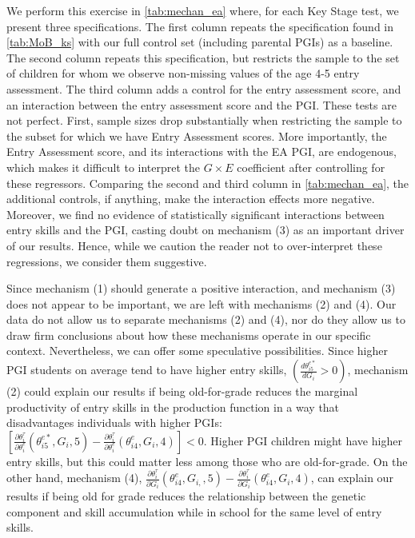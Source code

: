 \documentclass[12pt,a4paper]{article}
\begin{document}
\begin{bibunit}
We perform this exercise in  \autoref{tab:mechan_ea} where, for each Key Stage test, we present three specifications. The first column repeats the specification found in \autoref{tab:MoB_ks} with our full control set (including parental PGIs) as a baseline.  The second column repeats this specification, but restricts the sample to the set of children for whom we observe non-missing values of the age 4-5 entry assessment.  The third column adds a control for the entry assessment score, and an interaction between the entry assessment score and the PGI. These tests are not perfect. First, sample sizes drop substantially when restricting the sample to the subset for which we have Entry Assessment scores. More importantly, the Entry Assessment score, and its interactions with the EA PGI, are endogenous, which makes it difficult to interpret the $G\times{}E$ coefficient after controlling for these regressors. Comparing the second and third column in \autoref{tab:mechan_ea}, the additional controls, if anything, make the  interaction effects more negative. Moreover, we find no evidence of statistically significant interactions between entry skills and the PGI, casting doubt on mechanism (3) as an important driver of our results. Hence, while we caution the reader not to over-interpret these regressions, we consider them suggestive. 

Since mechanism (1) should generate a positive interaction, and mechanism (3) does not appear to be important, we are left with mechanisms (2) and (4). Our data do not allow us to separate mechanisms (2) and (4), nor do they allow us to draw firm conclusions about how these mechanisms operate in our specific context.  Nevertheless, we can offer some speculative possibilities. Since higher PGI students on average tend to have higher entry skills, $\left(\frac{d\theta^{e*}_{i5}}{d G_i}>0\right)$, mechanism (2) could explain our results if being old-for-grade reduces the marginal productivity of entry skills in the production function in a way that disadvantages individuals with higher PGIs:  $\left[\frac{\partial \theta_{i}^\tau}{\partial \theta_{i}^e}\left(\theta^{e*}_{i 5}, G_{i}, 5\right)-\frac{\partial\theta_{i}^\tau}{\partial \theta_{i}^e}\left(\theta^e_{i 4}, G_i, 4\right)\right] < 0$.
Higher PGI children might have higher entry skills, but this could matter less among those who are old-for-grade.  
On the other hand, mechanism (4), $\frac{\partial \theta_{i}^\tau}{\partial G_i}\left(\theta^e_{i 4}, G_{i,}, 5\right)-\frac{\partial \theta_{i}^\tau}{\partial G_i}\left(\theta^e_{i 4}, G_i, 4\right)$, can explain our results if being old for grade reduces the relationship between the genetic component and skill accumulation while in school for the same level of entry skills. 


\end{bibunit}
\end{document}
